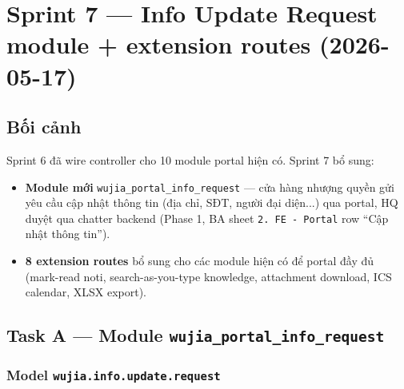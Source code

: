 \chapter{Sprint 7 --- Info Update Request module + extension routes (2026-05-17)}

\section{Bối cảnh}

Sprint 6 đã wire controller cho 10 module portal hiện có. Sprint 7 bổ sung:

\begin{itemize}[leftmargin=*]
    \item \textbf{Module mới} \texttt{wujia\_portal\_info\_request} --- cửa hàng nhượng quyền gửi yêu cầu cập nhật thông tin (địa chỉ, SĐT, người đại diện...) qua portal, HQ duyệt qua chatter backend (Phase 1, BA sheet \texttt{2. FE - Portal} row ``Cập nhật thông tin'').
    \item \textbf{8 extension routes} bổ sung cho các module hiện có để portal đầy đủ (mark-read noti, search-as-you-type knowledge, attachment download, ICS calendar, XLSX export).
\end{itemize}

\section{Task A --- Module \texttt{wujia\_portal\_info\_request}}

\subsection{Model \texttt{wujia.info.update.request}}

